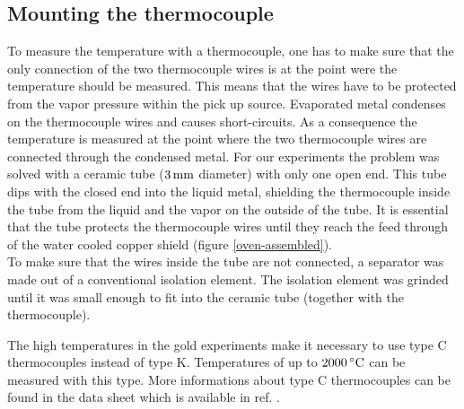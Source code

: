 \documentclass[parskip,12pt,headsepline,a4paper] {scrbook}
\begin{document}
\subsection{Mounting the thermocouple}
\vspace{-1\baselineskip}
To measure the temperature with a thermocouple, one has to make sure that the only connection of the two thermocouple wires is at the point were the temperature should be measured. This means that the wires have to be protected from the vapor pressure within the pick up source. Evaporated metal condenses on the thermocouple wires and causes short-circuits. As a consequence the temperature is measured at the point where the two thermocouple wires are connected through the condensed metal. For our experiments the problem was solved with a ceramic tube ($\unit[3]{mm}$ diameter) with only one open end. This tube dips with the closed end into the liquid metal, shielding the thermocouple inside the tube from the liquid and the vapor on the outside of the tube. It is essential that the tube protects the thermocouple wires until they reach the feed through of the water cooled copper shield (figure \ref{oven-assembled}). \\
To make sure that the wires inside the tube are not connected, a separator was made out of a conventional isolation element. The isolation element was grinded until it was small enough to fit into the ceramic tube (together with the thermocouple).

The high temperatures in the gold experiments make it necessary to use type C thermocouples instead of type K. Temperatures of up to $\unit[2000]{^\circ C}$ can be measured with this type. More informations about type C thermocouples can be found in the data sheet which is available in ref. \cite{ref-typec}. \\
\end{document}
